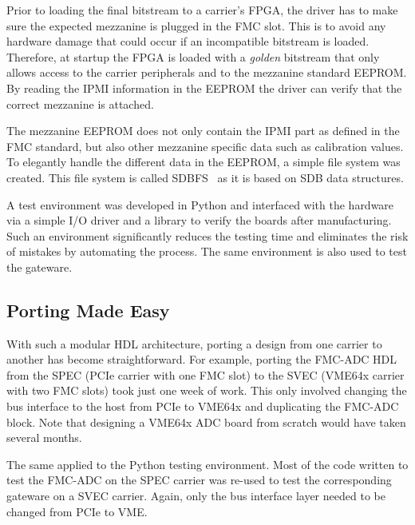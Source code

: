 \documentclass{JAC2003}
\begin{document}
Prior to loading the final bitstream to a carrier's FPGA, the driver has to make sure the expected mezzanine is plugged in the FMC slot.
This is to avoid any hardware damage that could occur if an incompatible bitstream is loaded.
Therefore, at startup the FPGA is loaded with a \textit{golden} bitstream that only allows access to the carrier peripherals and to the mezzanine standard EEPROM.
By reading the IPMI information in the EEPROM the driver can verify that the correct mezzanine is attached.

The mezzanine EEPROM does not only contain the IPMI part as defined in the FMC standard, but also other mezzanine specific data such as calibration values.
To elegantly handle the different data in the EEPROM, a simple file system was created.
This file system is called SDBFS~\cite{sdbfs} as it is based on SDB data structures.

A test environment was developed in Python and interfaced with the hardware via a simple I/O driver and a library to verify the boards after manufacturing.
Such an environment significantly reduces the testing time and eliminates the risk of mistakes by automating the process.
The same environment is also used to test the gateware.

\subsection{Porting Made Easy}
With such a modular HDL architecture, porting a design from one carrier to another has become straightforward.
For example, porting the FMC-ADC HDL from the SPEC (PCIe carrier with one FMC slot) to the SVEC (VME64x carrier with two FMC slots) took just one week of work.
This only involved changing the bus interface to the host from PCIe to VME64x and duplicating the FMC-ADC block.
Note that designing a VME64x ADC board from scratch would have taken several months.

The same applied to the Python testing environment.
Most of the code written to test the FMC-ADC on the SPEC carrier was re-used to test the corresponding gateware on a SVEC carrier.
Again, only the bus interface layer needed to be changed from PCIe to VME.

\begin{comment}
\subsection{Release Concept}
Usually, a single product involves several different OHWR projects.
By product, we mean a functional set of carrier and mezzanine boards along with gateware and software (e.g FMC-ADC + SPEC).
For a user to be able to use a product, at least three projects are needed; the carrier project for the golden bitstream, the mezzanine project for the application bitstream and the mezzanine software support project for the Linux device driver and test program.
To have better traceability, a release procedure was put in place.
For each component (gateware or software), the development is frozen into a \textit{release}.
In addition, compatible releases of the gateware and software are bundled together in an archive.
\end{comment}
\end{document}
